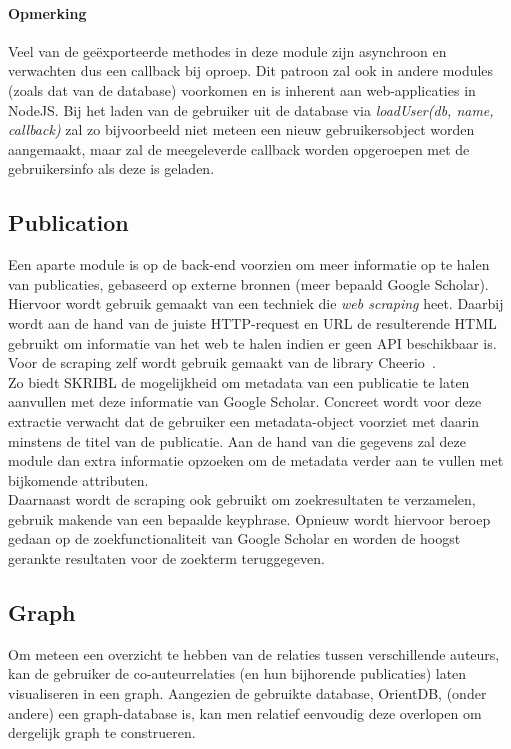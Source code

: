\documentclass{article}
\begin{document}
\paragraph{Opmerking}
Veel van de ge\"exporteerde methodes in deze module zijn asynchroon en verwachten dus een callback bij oproep. Dit patroon zal ook in andere modules (zoals dat van de database) voorkomen en is inherent aan web-applicaties in NodeJS. Bij het laden van de gebruiker uit de database via \textit{loadUser(db, name, callback)} zal zo bijvoorbeeld niet meteen een nieuw gebruikersobject worden aangemaakt, maar zal de meegeleverde callback worden opgeroepen met de gebruikersinfo als deze is geladen. 

\subsection{Publication}

Een aparte module is op de back-end voorzien om meer informatie op te halen van publicaties, gebaseerd op externe bronnen (meer bepaald Google Scholar). Hiervoor wordt gebruik gemaakt van een techniek die \textit{web scraping} heet. Daarbij wordt aan de hand van de juiste HTTP-request en URL de resulterende HTML gebruikt om informatie van het web te halen indien er geen API beschikbaar is. Voor de scraping zelf wordt gebruik gemaakt van de library Cheerio~\cite{website:cheerio}. \\

Zo biedt SKRIBL de mogelijkheid om metadata van een publicatie te laten aanvullen met deze informatie van Google Scholar. Concreet wordt voor deze extractie verwacht dat de gebruiker een metadata-object voorziet met daarin minstens de titel van de publicatie. Aan de hand van die gegevens zal deze module dan extra informatie opzoeken om de metadata verder aan te vullen met bijkomende attributen. \\

Daarnaast wordt de scraping ook gebruikt om zoekresultaten te verzamelen, gebruik makende van een bepaalde keyphrase. Opnieuw wordt hiervoor beroep gedaan op de zoekfunctionaliteit van Google Scholar en worden de hoogst gerankte resultaten voor de zoekterm teruggegeven.

\subsection{Graph}

Om meteen een overzicht te hebben van de relaties tussen verschillende auteurs, kan de gebruiker de co-auteurrelaties (en hun bijhorende publicaties) laten visualiseren in een graph. Aangezien de gebruikte database, OrientDB, (onder andere) een graph-database is, kan men relatief eenvoudig deze overlopen om dergelijk graph te construeren. \\
\end{document}
